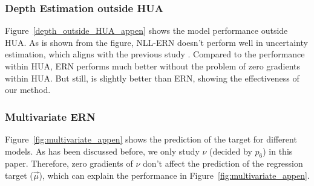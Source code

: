\subsubsection{Depth Estimation outside HUA}
Figure~\ref{depth_outside_HUA_appen} shows the model performance outside HUA. As is shown from the figure, NLL-ERN doesn't perform well in uncertainty estimation, which aligns with the previous study \cite{NEURIPS2020_aab08546}. Compared to the performance  within HUA, ERN performs much better without the problem of zero gradients within HUA. But still, \ours is slightly better than ERN, showing the effectiveness of our method.


\subsubsection{Multivariate ERN}
Figure~\ref{fig:multivariate_appen} shows the prediction of the target for different models. As has been discussed before, we only study $\nu$ (decided by $p_{6}$) in this paper. Therefore, zero gradients of $\nu$ don't affect the prediction of the regression target ($\vec{\mu}$), which can explain the performance in Figure~\ref{fig:multivariate_appen}.

